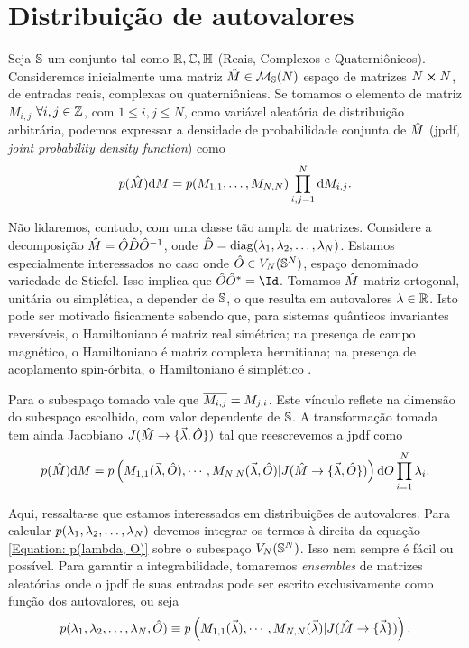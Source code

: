 \section{Distribuição de autovalores}

Seja $\mathbb{S}$ um conjunto tal como $\mathbb{R}, \mathbb{C}, \mathbb{H} $ (Reais, Complexos e Quaterniônicos). Consideremos inicialmente uma matriz $\hat M \in \mathcal{M}_{\mathbb{S}}(N)$ espaço de matrizes $N \cross N$, de entradas reais, complexas ou quaterniônicas. Se tomamos o elemento de matriz $M_{i,j}$ $\forall i, j \in \mathbb{Z}$, com $1 \leq i, j \leq N$, como variável aleatória de distribuição arbitrária, podemos expressar a densidade de probabilidade conjunta de $\hat M$ (jpdf, \textit{joint probability density function}) como $$p(\hat{M}) \dd M = p(M_{1,1}, \dots, M_{N,N}) \prod_{i,j=1}^{N} \dd M_{i,j}.$$

Não lidaremos, contudo, com uma classe tão ampla de matrizes. Considere a decomposição $\hat M = \hat O \hat D \hat O^{-1}$, onde $\hat D = \operatorname{diag}(\lambda_1, \lambda_2, \dots, \lambda_N)$. Estamos especialmente interessados no caso onde $\hat O \in V_N(\mathbb{S}^N)$, espaço denominado variedade de Stiefel. Isso implica que $ \matriz{O} \matriz{O}^* = \Id$. Tomamos $\hat M$ matriz ortogonal, unitária ou simplética, a depender de $\mathbb{S}$, o que resulta em autovalores $\lambda \in \mathbb{R}$. Isto pode ser motivado fisicamente sabendo que, para sistemas quânticos invariantes reversíveis, o Hamiltoniano é matriz real simétrica; na presença de campo magnético, o Hamiltoniano é matriz complexa hermitiana; na presença de acoplamento spin-órbita, o Hamiltoniano é simplético \cite[Capítulo~2]{RMT-firstcourse-Potters}.

Para o subespaço tomado vale que $\overline{M_{i,j}} = M_{j, i}$. Este vínculo reflete na dimensão do subespaço escolhido, com valor dependente de $\mathbb{S}$. A transformação tomada tem ainda Jacobiano $J(\hat M \rightarrow \{ \vec{\lambda}, \hat O \} )$ tal que reescrevemos a jpdf como 
\begin{equation}
	 p(\hat{M}) \dd M = p \left( M_{1,1}(\vec{\lambda}, \hat O), \cdots, M_{N,N}(\vec{\lambda}, \hat O) | J(\hat M \rightarrow \{ \vec{\lambda}, \hat O \} ) \right) \dd O \prod_{i=1}^{N} \lambda_i.
\label{Equation: p(lambda, O)}
\end{equation}

Aqui, ressalta-se que estamos interessados em distribuições de autovalores. Para calcular $p(\lambda_1, \lambda_2, \dots, \lambda_N)$ devemos integrar os termos à direita da equação \ref{Equation: p(lambda, O)} sobre o subespaço $V_N(\mathbb{S}^N)$. Isso nem sempre é fácil ou possível. Para garantir a integrabilidade, tomaremos \textit{ensembles} de matrizes aleatórias onde o jpdf de suas entradas pode ser escrito exclusivamente como função dos autovalores, ou seja $$p(\lambda_1, \lambda_2, \dots, \lambda_N, \hat O) \equiv p \left( M_{1,1}(\vec{\lambda}), \cdots, M_{N,N}(\vec{\lambda}) | J(\hat M \rightarrow \{ \vec{\lambda} \} ) \right).$$

